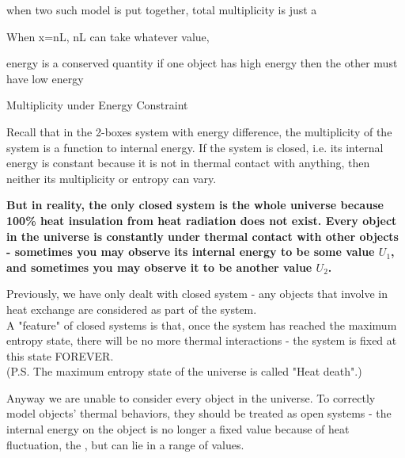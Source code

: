 \documentclass[class=article, crop=false, 12pt]{standalone}
\begin{document}
when two such model is put together,
total multiplicity is just a 

When x=nL, 
nL can take whatever value, 

energy is a conserved quantity
if one object has high energy then the other must have low energy

Multiplicity under Energy Constraint



Recall that in the 2-boxes system with energy difference,
the multiplicity of the system is a function to internal energy.
If the system is closed, 
i.e. its internal energy is constant because it is not in thermal contact with anything, 
then neither its multiplicity or entropy can vary.


\bf{But in reality, the only closed system is the whole universe}
because 100\% heat insulation from heat radiation does not exist.
Every object in the universe is constantly under thermal contact with other objects - 
sometimes you may observe its internal energy to be some value $U_1$,
and sometimes you may observe it to be another value $U_2$.

\begin{center}
\end{center}




Previously, we have only dealt with closed system - 
any objects that involve in heat exchange are considered as part of the system.
\\

\iffalse
A "feature" of closed systems is that, 
once the system has reached the maximum entropy state,
there will be no more thermal interactions -
the system is fixed at this state FOREVER.\\
(P.S. The maximum entropy state of the universe is called "Heat death".)



Anyway we are unable to consider every object in the universe.
To correctly model objects' thermal behaviors,
they should be treated as open systems - 
the internal energy on the object is no longer a fixed value because of heat fluctuation,
the ,
but can lie in a range of values.
\end{document}
